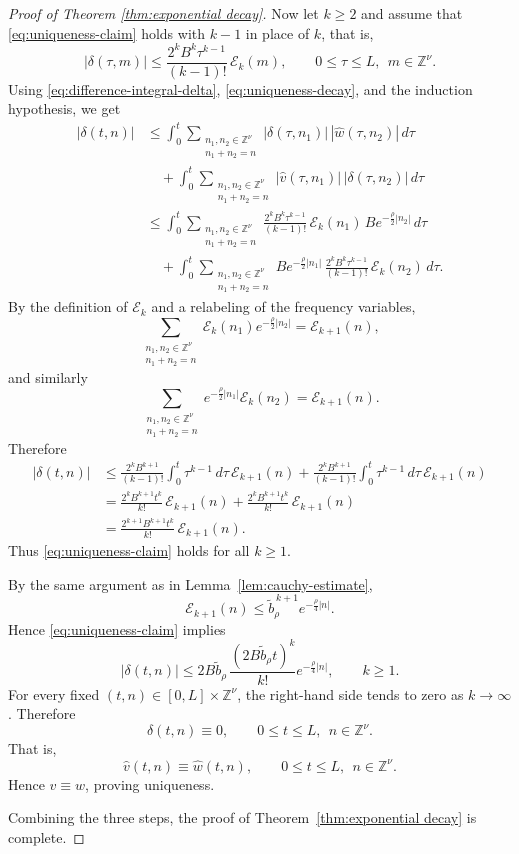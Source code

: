 \documentclass[10pt,a4paper]{amsart}
\begin{document}
\begin{proof}[Proof of Theorem \ref{thm:exponential decay}]
Now let $k\geq 2$ and assume that \eqref{eq:uniqueness-claim} holds with $k-1$
in place of $k$, that is,
\[
|\delta(\tau,m)|
\leq
\frac{2^{k}B^{k}\tau^{k-1}}{(k-1)!}\,\mathcal{E}_{k}(m),
\qquad
0\leq \tau\leq L,\ \ m\in \mathbb{Z}^{\nu}.
\]
Using \eqref{eq:difference-integral-delta}, \eqref{eq:uniqueness-decay}, and the
induction hypothesis, we get
\begin{align*}
|\delta(t,n)|
&\leq
\int_0^t
\sum_{\substack{n_1,n_2\in \mathbb{Z}^{\nu}\\ n_1+n_2=n}}
|\delta(\tau,n_1)|\,|\widehat w(\tau,n_2)|\,d\tau \\
&\quad+
\int_0^t
\sum_{\substack{n_1,n_2\in \mathbb{Z}^{\nu}\\ n_1+n_2=n}}
|\widehat v(\tau,n_1)|\,|\delta(\tau,n_2)|\,d\tau \\
&\leq
\int_0^t
\sum_{\substack{n_1,n_2\in \mathbb{Z}^{\nu}\\ n_1+n_2=n}}
\frac{2^{k}B^{k}\tau^{k-1}}{(k-1)!}\,\mathcal{E}_{k}(n_1)\,
B e^{-\frac{\rho}{2}|n_2|}\,d\tau \\
&\quad+
\int_0^t
\sum_{\substack{n_1,n_2\in \mathbb{Z}^{\nu}\\ n_1+n_2=n}}
B e^{-\frac{\rho}{2}|n_1|}\,
\frac{2^{k}B^{k}\tau^{k-1}}{(k-1)!}\,\mathcal{E}_{k}(n_2)\,d\tau .
\end{align*}
By the definition of $\mathcal{E}_{k}$ and a relabeling of the frequency variables,
\[
\sum_{\substack{n_1,n_2\in \mathbb{Z}^{\nu}\\ n_1+n_2=n}}
\mathcal{E}_{k}(n_1)e^{-\frac{\rho}{2}|n_2|}
=
\mathcal{E}_{k+1}(n),
\]
and similarly
\[
\sum_{\substack{n_1,n_2\in \mathbb{Z}^{\nu}\\ n_1+n_2=n}}
e^{-\frac{\rho}{2}|n_1|}\mathcal{E}_{k}(n_2)
=
\mathcal{E}_{k+1}(n).
\]
Therefore
\begin{align*}
|\delta(t,n)|
&\leq
\frac{2^{k}B^{k+1}}{(k-1)!}
\int_0^t \tau^{k-1}\,d\tau \, \mathcal{E}_{k+1}(n)
+
\frac{2^{k}B^{k+1}}{(k-1)!}
\int_0^t \tau^{k-1}\,d\tau \, \mathcal{E}_{k+1}(n) \\
&=
\frac{2^{k}B^{k+1}t^k}{k!}\,\mathcal{E}_{k+1}(n)
+
\frac{2^{k}B^{k+1}t^k}{k!}\,\mathcal{E}_{k+1}(n) \\
&=
\frac{2^{k+1}B^{k+1}t^k}{k!}\,\mathcal{E}_{k+1}(n).
\end{align*}
Thus \eqref{eq:uniqueness-claim} holds for all $k\geq 1$.

By the same argument as in Lemma~\ref{lem:cauchy-estimate},
\[
\mathcal{E}_{k+1}(n)
\leq
\widetilde b_{\rho}^{\,k+1} e^{-\frac{\rho}{4}|n|}.
\]
Hence \eqref{eq:uniqueness-claim} implies
\[
|\delta(t,n)|
\leq
2B\widetilde b_{\rho}\,
\frac{(2B\widetilde b_{\rho}t)^k}{k!}
e^{-\frac{\rho}{4}|n|},
\qquad
k\geq 1.
\]
For every fixed $(t,n)\in [0,L]\times \mathbb{Z}^{\nu}$, the right-hand side tends to
zero as $k\to\infty$. Therefore
\[
\delta(t,n)\equiv 0,
\qquad
0\leq t\leq L,\ \ n\in \mathbb{Z}^{\nu}.
\]
That is,
\[
\widehat v(t,n)\equiv \widehat w(t,n),
\qquad
0\leq t\leq L,\ \ n\in \mathbb{Z}^{\nu}.
\]
Hence $v\equiv w$, proving uniqueness.

Combining the three steps, the proof of Theorem~\ref{thm:exponential decay} is complete.
\end{proof}
\end{document}
